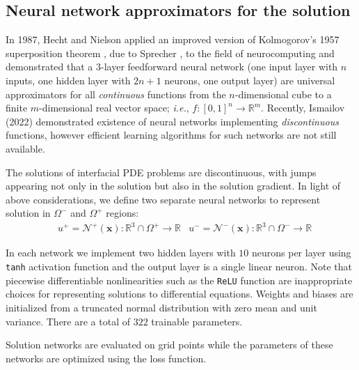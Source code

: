 \documentclass{elsarticle}
\begin{document}
\subsection{Neural network approximators for the solution}

In 1987, Hecht and Nielson \cite{hecht1987kolmogorov} applied an improved version of Kolmogorov's 1957 superposition theorem \cite{kolmogorov1957representation}, due to Sprecher \cite{sprecher1965structure}, to the field of neurocomputing and demonstrated that a $3$-layer feedforward neural network (one input layer with $n$ inputs, one hidden layer with $2n+1$ neurons, one output layer) are universal approximators for all \textit{continuous} functions from the $n$-dimensional cube to a finite $m$-dimensional real vector space; \textit{i.e.}, $f: [0,1]^n \rightarrow \mathbb{R}^m $. Recently, Ismailov (2022) \cite{ismailov2022} demonstrated existence of neural networks implementing \textit{discontinuous} functions, however efficient learning algorithms for such networks are not still available. 

The solutions of interfacial PDE problems are discontinuous, with jumps appearing not only in the solution but also in the solution gradient. In light of above considerations, we define two separate neural networks to represent solution in $\Omega^-$ and $\Omega^+$ regions:
\begin{align*}
& u^+ = \mathcal{N}^+(\mathbf{x}): \mathbb{R}^3\cap \Omega^+ \rightarrow \mathbb{R}  & u^- = \mathcal{N}^-(\mathbf{x}): \mathbb{R}^3\cap \Omega^- \rightarrow \mathbb{R}
\end{align*}

In each network we implement two hidden layers with $10$ neurons per layer using \texttt{tanh} activation function and the output layer is a single linear neuron. Note that piecewise differentiable nonlinearities such as the \texttt{ReLU} function are inappropriate choices for representing solutions to differential equations. Weights and biases are initialized from a truncated normal distribution with zero mean and unit variance. There are a total of $322$ trainable parameters.

Solution networks are evaluated on grid points while the parameters of these networks are optimized using the loss function.
\end{document}
